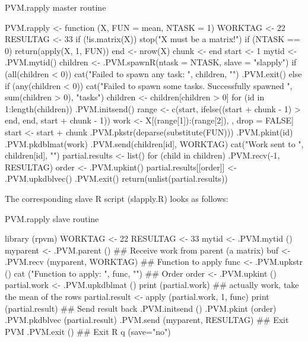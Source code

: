 \begin{Example} PVM.rapply master routine
\begin{Scode}

PVM.rapply <- function (X, FUN = mean, NTASK = 1)
{
    WORKTAG <- 22
    RESULTAG <- 33
    if (!is.matrix(X)) {
        stop("X must be a matrix!")
    }
    if (NTASK == 0) {
        return(apply(X, 1, FUN))
    }
    end <- nrow(X)
    chunk <- end%
    start <- 1
    mytid <- .PVM.mytid()
    children <- .PVM.spawnR(ntask = NTASK, slave = "slapply")
    if (all(children < 0)) {
        cat("Failed to spawn any task: ", children, "\n")
        .PVM.exit()
    }
    else if (any(children < 0)) {
        cat("Failed to spawn some tasks.  Successfully spawned ",
            sum(children > 0), "tasks\n")
        children <- children[children > 0]
    }
    for (id in 1:length(children)) {
        .PVM.initsend()
        range <- c(start, ifelse((start + chunk - 1) > end, end,
            start + chunk - 1))
        work <- X[(range[1]):(range[2]), , drop = FALSE]
        start <- start + chunk
        .PVM.pkstr(deparse(substitute(FUN)))
        .PVM.pkint(id)
        .PVM.pkdblmat(work)
        .PVM.send(children[id], WORKTAG)
        cat("Work sent to ", children[id], "\n")
    }
    partial.results <- list()
    for (child in children) {
        .PVM.recv(-1, RESULTAG)
        order <- .PVM.upkint()
        partial.results[[order]] <- .PVM.upkdblvec()
    }
    .PVM.exit()
    return(unlist(partial.results))
}
\end{Scode} 
\label{ex:rpvm-rapplymaster}
\end{Example}
The corresponding slave R script (slapply.R) looks as follows:

\begin{Example} PVM.rapply slave routine
\begin{Scode}

library (rpvm)
WORKTAG <- 22
RESULTAG <- 33
mytid  <- .PVM.mytid ()
myparent  <- .PVM.parent ()
## Receive work from parent (a matrix)
buf <- .PVM.recv (myparent, WORKTAG)
## Function to apply
func  <- .PVM.upkstr ()
cat ("Function to apply: ", func, "\n")
## Order
order <- .PVM.upkint ()
partial.work <- .PVM.upkdblmat ()
print (partial.work)
## actually work, take the mean of the rows
partial.result <- apply (partial.work, 1, func)
print (partial.result)
## Send result back
.PVM.initsend ()
.PVM.pkint (order)
.PVM.pkdblvec (partial.result)
.PVM.send (myparent, RESULTAG)
## Exit PVM
.PVM.exit ()
## Exit R
q (save="no")
\end{Scode}
\label{ex:rpvm-rapplyslave}
\end{Example}


